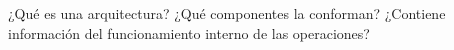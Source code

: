 \begin{enunciado}{\ejercicio}
    ¿Qué es una arquitectura? ¿Qué componentes la conforman? ¿Contiene información del funcionamiento interno de las operaciones?
    \end{enunciado}
    